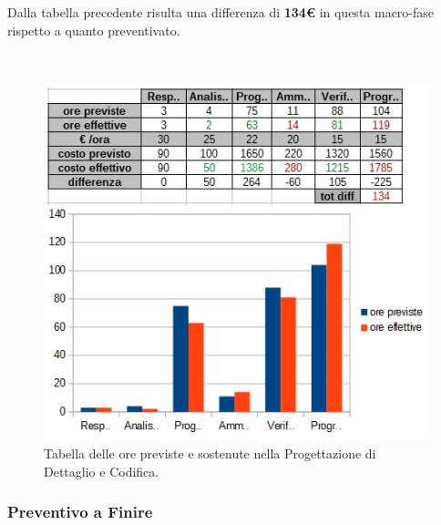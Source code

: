 Dalla tabella precedente risulta una differenza di \textbf{134€} in questa macro-fase rispetto a quanto preventivato. 

\\
\begin{figure}[h]
\begin{center}
\includegraphics[scale=0.70]{img/consuntivo-progdet-tot.png}
\caption{Tabella delle ore previste e sostenute nella Progettazione di Dettaglio e Codifica.}
\end{center}
\end{figure}
\clearpage

\subsubsection{Preventivo a Finire}





